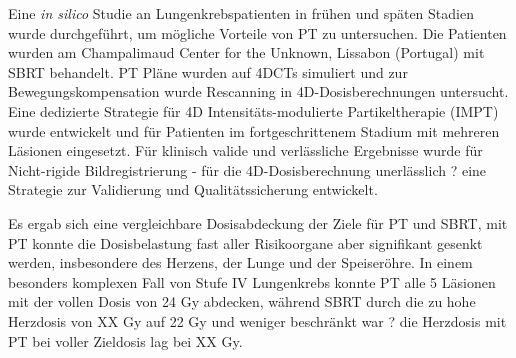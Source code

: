 Eine \textit{in silico} Studie an Lungenkrebspatienten in fr\"{u}hen und sp\"{a}ten Stadien wurde durchgef\"{u}hrt, 
um m\"{o}gliche Vorteile von PT zu untersuchen. Die Patienten wurden am Champalimaud Center for the 
Unknown, Lissabon (Portugal) mit SBRT behandelt. PT Pl\"{a}ne wurden auf 4DCTs simuliert und zur 
Bewegungskompensation wurde Rescanning in 4D-Dosisberechnungen untersucht. Eine dedizierte Strategie 
f\"{u}r 4D Intensit\"{a}ts-modulierte Partikeltherapie (IMPT) wurde entwickelt und f\"{u}r Patienten im fortgeschrittenem 
Stadium mit mehreren L\"{a}sionen eingesetzt. F\"{u}r klinisch valide und verl\"{a}ssliche Ergebnisse wurde f\"{u}r Nicht-rigide
Bildregistrierung - f\"{u}r die 4D-Dosisberechnung unerl\"{a}sslich ? eine Strategie zur Validierung und Qualit\"{a}tssicherung entwickelt.

Es ergab sich eine vergleichbare Dosisabdeckung der Ziele f\"{u}r PT und SBRT, mit PT konnte die 
Dosisbelastung fast aller Risikoorgane aber signifikant gesenkt werden, insbesondere des Herzens, der Lunge und der Speiser\"{o}hre. 
In einem besonders komplexen Fall von Stufe IV Lungenkrebs konnte PT alle 5 L\"{a}sionen mit der vollen Dosis von 24 Gy abdecken, w\"{a}hrend SBRT 
durch die zu hohe Herzdosis von XX Gy auf 22 Gy und weniger beschr\"{a}nkt war ? die Herzdosis mit PT bei voller Zieldosis lag bei XX Gy.


